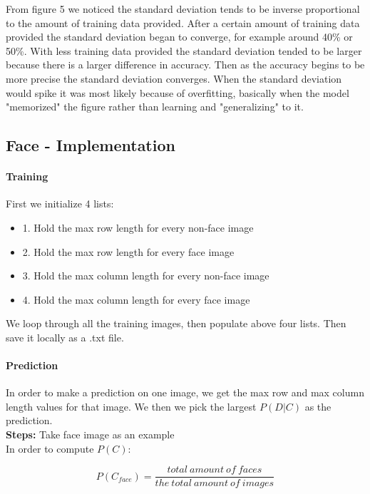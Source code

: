 \documentclass[11pt]{report}
\begin{document}
From figure 5 we noticed the standard deviation tends to be inverse proportional to the amount of training data provided. After a certain amount of training data provided the standard deviation began to converge, for example around 40\% or 50\%. With less training data provided the standard deviation tended to be larger because there is a larger difference in accuracy. Then as the accuracy begins to be more precise the standard deviation converges. When the standard deviation would spike it was most likely because of overfitting, basically when the model "memorized" the figure rather than learning and "generalizing" to it.

\subsection*{Face - Implementation}

\paragraph{Training}
First we initialize 4 lists:

\begin{itemize}
\item 1. Hold the max row length for every non-face image
\item 2. Hold the max row length for every face image
\item 3. Hold the max column length for every non-face image
\item 4. Hold the max column length for every face image
\end{itemize}

We loop through all the training images, then populate above four lists. Then save it locally as a .txt file.

\paragraph{Prediction}
In order to make a prediction on one image, we get the max row and max column length 
values for  that image. We then we pick the largest $P(D|C)$ as the prediction. \\

\textbf{Steps:} 
Take face image as an example\\

In order to compute $P(C)$:

$$P(C_{face}) = \frac{total\ amount\ of\ faces}{the\ total\ amount\ of\ images}$$
\end{document}

